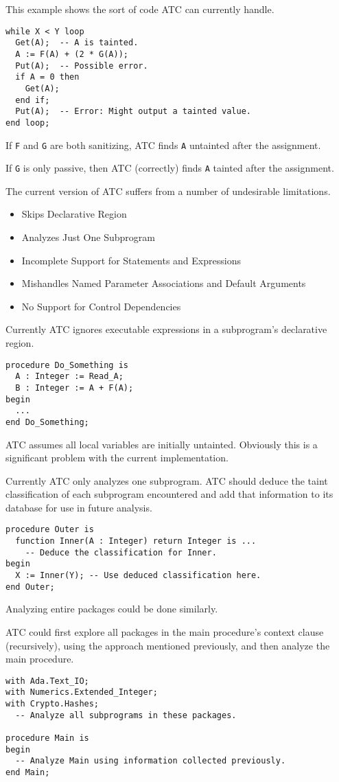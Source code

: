 \documentclass[landscape]{slides}
\begin{document}
This example shows the sort of code ATC can currently handle.
\begin{verbatim}
while X < Y loop
  Get(A);  -- A is tainted.
  A := F(A) + (2 * G(A));
  Put(A);  -- Possible error.
  if A = 0 then
    Get(A);
  end if;
  Put(A);  -- Error: Might output a tainted value.
end loop;
\end{verbatim}
If \texttt{F} and \texttt{G} are both sanitizing, ATC finds \texttt{A} untainted after the
assignment.

If \texttt{G} is only passive, then ATC (correctly) finds \texttt{A} tainted after the
assignment.
\stopslide

The current version of ATC suffers from a number of undesirable limitations.
\begin{itemize}
\item Skips Declarative Region
\item Analyzes Just One Subprogram
\item Incomplete Support for Statements and Expressions
\item Mishandles Named Parameter Associations and Default Arguments
\item No Support for Control Dependencies
\end{itemize}
\stopslide

Currently ATC ignores executable expressions in a subprogram's declarative region.
\begin{verbatim}
procedure Do_Something is
  A : Integer := Read_A;
  B : Integer := A + F(A);
begin
  ...
end Do_Something;
\end{verbatim}
ATC assumes all local variables are initially untainted. Obviously this is a significant problem
with the current implementation.
\stopslide

Currently ATC only analyzes one subprogram. ATC should deduce the taint classification of each
subprogram encountered and add that information to its database for use in future analysis.
\begin{verbatim}
procedure Outer is
  function Inner(A : Integer) return Integer is ...
    -- Deduce the classification for Inner.
begin
  X := Inner(Y); -- Use deduced classification here.
end Outer;
\end{verbatim}
Analyzing entire packages could be done similarly.
\stopslide

ATC could first explore all packages in the main procedure's context clause (recursively), using
the approach mentioned previously, and then analyze the main procedure.
\begin{verbatim}
with Ada.Text_IO;
with Numerics.Extended_Integer;
with Crypto.Hashes;
  -- Analyze all subprograms in these packages.

procedure Main is
begin
  -- Analyze Main using information collected previously.
end Main;
\end{verbatim}
\stopslide
\end{document}
